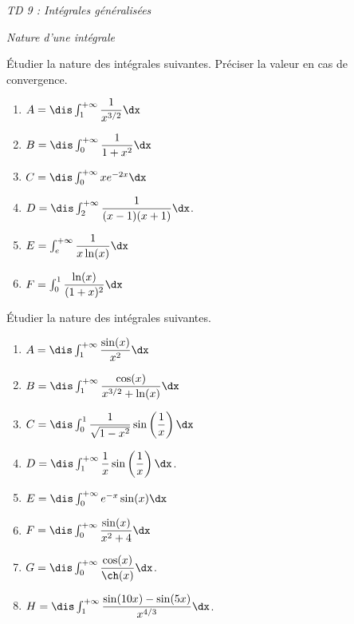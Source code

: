 \documentclass[a4paper,10pt]{report}
\begin{document}
\everymath{\displaystyle}
\begin{center}
\textit{{ {\huge TD 9 : Intégrales généralisées}}}
\end{center}


\bigskip

\begin{center}
\textit{{ {\large Nature d'une intégrale}}}
\end{center}

\medskip

\begin{Exercice}{} Étudier la nature des intégrales suivantes. Préciser la valeur en cas de convergence.

\begin{multicols}{2}
\begin{enumerate}
\item $A = \dis \int_1^{+ \infty} \dfrac{1}{x^{3/2}} \dx$
\item $B = \dis \int_0^{+ \infty} \dfrac{1}{1+x^2} \dx$
\item $C = \dis \int_0^{+ \infty} x e^{-2x} \dx$
\item $D= \dis \int_2^{+ \infty} \dfrac{1}{(x-1)(x+1)} \dx$.
\item $E= \int_{e}^{+ \infty} \dfrac{1}{x\ln(x)} \dx$
\item $F= \int_0^1 \dfrac{\ln(x)}{(1+x)^2} \dx$
\end{enumerate}
\end{multicols}
\vspace{0.1cm}
\end{Exercice}



\begin{Exercice}{} Étudier la nature des intégrales suivantes. 

\begin{multicols}{2}
\begin{enumerate}
\item $A = \dis \int_1^{+ \infty} \dfrac{\sin(x)}{x^2} \dx$
\item $B = \dis \int_1^{+ \infty} \dfrac{\cos(x)}{x^{3/2}+\ln(x)} \dx$
\item $C = \dis \int_0^{1} \dfrac{1}{\sqrt{1-x^2}} \sin \left(\dfrac{1}{x}\right) \dx$
\item $D= \dis \int_1^{+ \infty} \dfrac{1}{x} \sin \left(\dfrac{1}{x}\right) \dx$.
\item $E= \dis \int_{0}^{+ \infty} e^{-x} \sin(x) \dx$
\item $F= \dis \int_0^{+\infty} \dfrac{\sin(x)}{x^2+4} \dx$
\item $G= \dis \int_0^{+ \infty} \dfrac{\cos(x)}{\ch(x)} \dx$.
\item $H= \dis \int_1^{+\infty} \dfrac{\sin(10x)-\sin(5x)}{x^{4/3}} \dx$.
\end{enumerate}
\end{multicols}
\vspace{0.1cm}
\end{Exercice}
\end{document}
